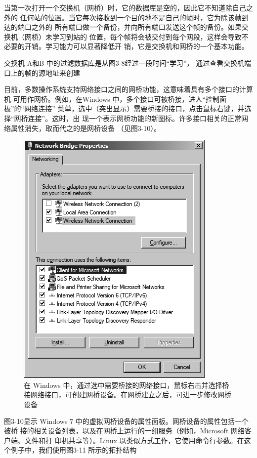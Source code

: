 当第一次打开一个交换机（网桥）时，它的数据库是空的，因此它不知道除自己之外的
任何站的位置。当它每次接收到一个目的地不是自己的帧时，它为除该帧到达的端口之外的
所有端口做一个备份，并向所有端口发送这个帧的备份。如果交换机（网桥）未学习到站的
位置，每个帧将会被交付到每个网段，这样会导致不必要的开销。学习能力可以显著降低开
销，它是交换机和网桥的一个基本功能。

交换机 A和B 中的过滤数据库是从图3-8经过一段时间“学习”，
通过查看交换机端口上的帧的源地址来创建

目前，多数操作系统支持网络接口之间的网桥功能，这意味着具有多个接口的计算机
可用作网桥。例如，在Windows 中，多个接口可被桥接，进人“控制面板”的“网络连接”
菜单，选中（突出显示）需要桥接的接口，点击鼠标右键，并选择“网桥连接”。这时，出
现一个表示网桥功能的新图标。许多接口相关的正常网络属性消失，取而代之的是网桥设备
（见图3-10）。

\begin{figure}
    \centering
    \includegraphics[scale=0.5]{imgs/3/3-10.png}
    \caption{在 Windows 中，通过选中需要桥接的网络接口，鼠标右击并选择桥接网络接口，可创建网桥设备。在网桥建立之后，可进一步修改网桥设备}
\end{figure}

图3-10显示 Windows 7 中的虚拟网桥设备的属性面板。网桥设备的属性包括一个被桥
接的相关设备列表，以及在网桥上运行的一组服务（例如，Microsoft 网络客户端、文件和打
印机共享等）。Linux 以类似方式工作，它使用命令行参数。在这个例子中，我们使用图3-11
所示的拓扑结构

